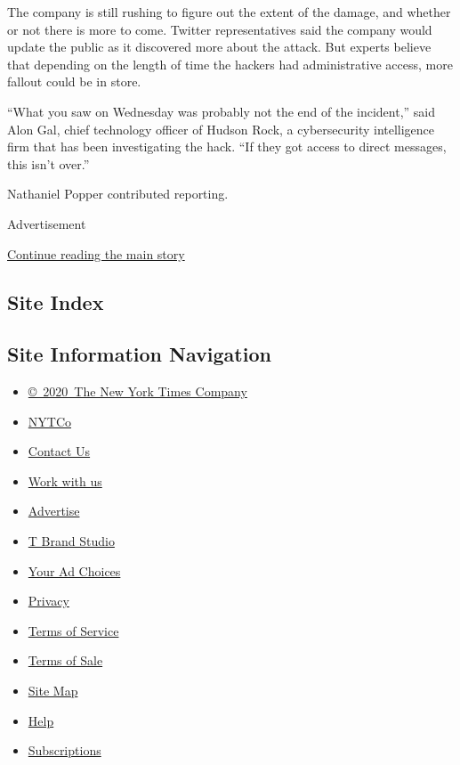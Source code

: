 The company is still rushing to figure out the extent of the damage, and
whether or not there is more to come. Twitter representatives said the
company would update the public as it discovered more about the attack.
But experts believe that depending on the length of time the hackers had
administrative access, more fallout could be in store.

``What you saw on Wednesday was probably not the end of the incident,''
said Alon Gal, chief technology officer of Hudson Rock, a cybersecurity
intelligence firm that has been investigating the hack. ``If they got
access to direct messages, this isn't over.''

Nathaniel Popper contributed reporting.

Advertisement

\protect\hyperlink{after-bottom}{Continue reading the main story}

\hypertarget{site-index}{%
\subsection{Site Index}\label{site-index}}

\hypertarget{site-information-navigation}{%
\subsection{Site Information
Navigation}\label{site-information-navigation}}

\begin{itemize}
\tightlist
\item
  \href{https://help.nytimes.com/hc/en-us/articles/115014792127-Copyright-notice}{©~2020~The
  New York Times Company}
\end{itemize}

\begin{itemize}
\tightlist
\item
  \href{https://www.nytco.com/}{NYTCo}
\item
  \href{https://help.nytimes.com/hc/en-us/articles/115015385887-Contact-Us}{Contact
  Us}
\item
  \href{https://www.nytco.com/careers/}{Work with us}
\item
  \href{https://nytmediakit.com/}{Advertise}
\item
  \href{http://www.tbrandstudio.com/}{T Brand Studio}
\item
  \href{https://www.nytimes.com/privacy/cookie-policy\#how-do-i-manage-trackers}{Your
  Ad Choices}
\item
  \href{https://www.nytimes.com/privacy}{Privacy}
\item
  \href{https://help.nytimes.com/hc/en-us/articles/115014893428-Terms-of-service}{Terms
  of Service}
\item
  \href{https://help.nytimes.com/hc/en-us/articles/115014893968-Terms-of-sale}{Terms
  of Sale}
\item
  \href{https://spiderbites.nytimes.com}{Site Map}
\item
  \href{https://help.nytimes.com/hc/en-us}{Help}
\item
  \href{https://www.nytimes.com/subscription?campaignId=37WXW}{Subscriptions}
\end{itemize}
